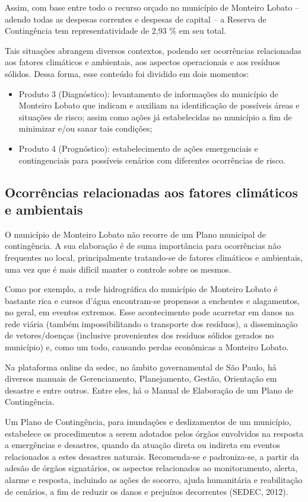 

Assim, com base entre todo o recurso orçado no município de Monteiro Lobato – adendo todas as despesas correntes e despesas de capital – a Reserva de Contingência tem representatividade de 2,93 \% em seu total.

Tais situações abrangem diversos contextos, podendo ser ocorrências relacionadas aos fatores climáticos e ambientais, aos aspectos operacionais e aos resíduos sólidos. Dessa forma, esse conteúdo foi dividido em dois momentos:
\begin{itemize}
	\item Produto 3 (Diagnóstico): levantamento de informações do município de Monteiro Lobato que indicam e auxiliam na identificação de possíveis áreas e situações de risco; assim como ações já estabelecidas no município a fim de minimizar e/ou sanar tais condições;
	\item Produto 4 (Prognóstico): estabelecimento de ações emergenciais e contingenciais para possíveis cenários com diferentes ocorrências de risco.
\end{itemize}

\subsection{Ocorrências relacionadas aos fatores climáticos e ambientais}
O município de Monteiro Lobato não recorre de um Plano municipal de contingência. A sua elaboração é de suma importância para ocorrências não frequentes no local, principalmente tratando-se de fatores climáticos e ambientais, uma vez que é mais difícil manter o controle sobre os mesmos.

Como por exemplo, a rede hidrográfica do município de Monteiro Lobato é bastante rica e cursos d’água encontram-se propensos a enchentes e alagamentos, no geral, em eventos extremos. Esse acontecimento pode acarretar em danos na rede viária (também impossibilitando o transporte dos resíduos), a disseminação de vetores/doenças (inclusive provenientes dos resíduos sólidos gerados no município) e, como um todo, causando perdas econômicas a Monteiro Lobato.

Na plataforma online da \gls{sedec}, no âmbito governamental de São Paulo, há diversos manuais de Gerenciamento, Planejamento, Gestão, Orientação em desastre e entre outros. Entre eles, há o Manual de Elaboração de um Plano de Contingência. 

Um Plano de Contingência, para inundações e deslizamentos de um município, estabelece os procedimentos a serem adotados pelos órgãos envolvidos na resposta a emergências e desastres, quando da atuação direta ou indireta em eventos relacionados a estes desastres naturais. Recomenda-se e padroniza-se, a partir da adesão de   órgãos signatários, os aspectos relacionados ao monitoramento, alerta, alarme e resposta, incluindo as ações de socorro, ajuda humanitária e reabilitação de cenários, a fim de reduzir os danos e prejuízos decorrentes (SEDEC, 2012).

